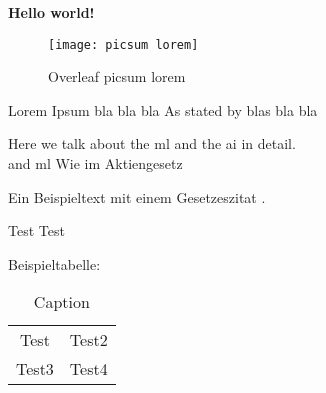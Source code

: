 \documentclass[../main.tex]{subfiles}
\begin{document}
\textbf{Hello world!}

\begin{figure}[bh]
\centering
\texttt{[image: picsum lorem]}

\label{fig:picsum lorem}
\caption{Overleaf picsum lorem}
\end{figure}

Lorem Ipsum bla\autocite[10]{smith2018} bla bla As stated by 
blas bla bla 

Here we talk about the \gls{ml} and the \gls{ai} in detail.\\ and \gls{ml}
Wie im Aktiengesetz 

Ein Beispieltext mit einem Gesetzeszitat .


Test Test \autocite[10]{johnson2020}

\medskip

Beispieltabelle: 


\begin{table}
    \centering
    \begin{tabular}{cc}
        Test & Test2\\
        Test3 & Test4\\
    \end{tabular}
    \caption{Caption}
    \label{tab:my_label}
\end{table}
 
\end{document}
